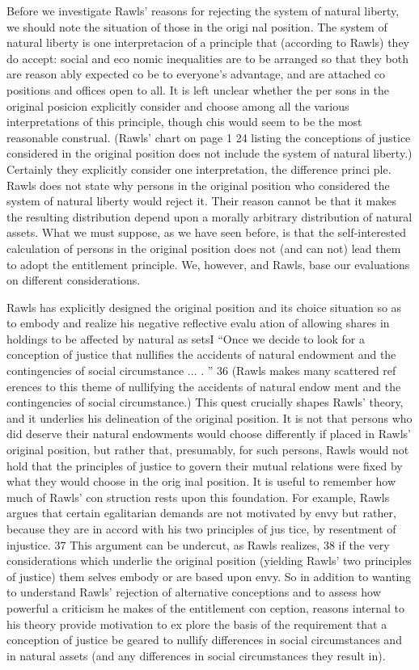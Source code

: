 \documentclass[11pt,openany]{book}
\begin{document}
Before we investigate Rawls' reasons for rejecting the system of natural liberty, we should note the situation of those in the origi nal position. The system of natural liberty is one interpretacion of a principle that (according to Rawls) they do accept: social and eco nomic inequalities are to be arranged so that they both are reason ably expected co be to everyone's advantage, and are attached co positions and offices open to all. It is left unclear whether the per sons in the original posicion explicitly consider and choose among all the various interpretations of this principle, though chis would seem to be the most reasonable construal. (Rawls' chart on page 1 24 listing the conceptions of justice considered in the original position does not include the system of natural liberty.) Certainly they explicitly consider one interpretation, the difference princi ple. Rawls does not state why persons in the original position who considered the system of natural liberty would reject it. Their reason cannot be that it makes the resulting distribution depend upon a morally arbitrary distribution of natural assets. What we must suppose, as we have seen before, is that the self-interested calculation of persons in the original position does not (and can not) lead them to adopt the entitlement principle. We, however, and Rawls, base our evaluations on different considerations. 

Rawls has explicitly designed the original position and its choice situation so as to embody and realize his negative reflective evalu ation of allowing shares in holdings to be affected by natural as setsI ``Once we decide to look for a conception of justice that nullifies the accidents of natural endowment and the contingencies of social circumstance ... . '' 36 (Rawls makes many scattered ref erences to this theme of nullifying the accidents of natural endow ment and the contingencies of social circumstance.) This quest crucially shapes Rawls' theory, and it underlies his delineation of the original position. It is not that persons who did deserve their natural endowments would choose differently if placed in Rawls' original position, but rather that, presumably, for such persons, Rawls would not hold that the principles of justice to govern their mutual relations were fixed by what they would choose in the orig inal position. It is useful to remember how much of Rawls' con struction rests upon this foundation. For example, Rawls argues that certain egalitarian demands are not motivated by envy but rather, because they are in accord with his two principles of jus tice, by resentment of injustice. 37 This argument can be undercut, as Rawls realizes, 38 if the very considerations which underlie the original position (yielding Rawls' two principles of justice) them selves embody or are based upon envy. So in addition to wanting to understand Rawls' rejection of alternative conceptions and to assess how powerful a criticism he makes of the entitlement con ception, reasons internal to his theory provide motivation to ex plore the basis of the requirement that a conception of justice be geared to nullify differences in social circumstances and in natural assets (and any differences in social circumstances they result in). 
\end{document}
